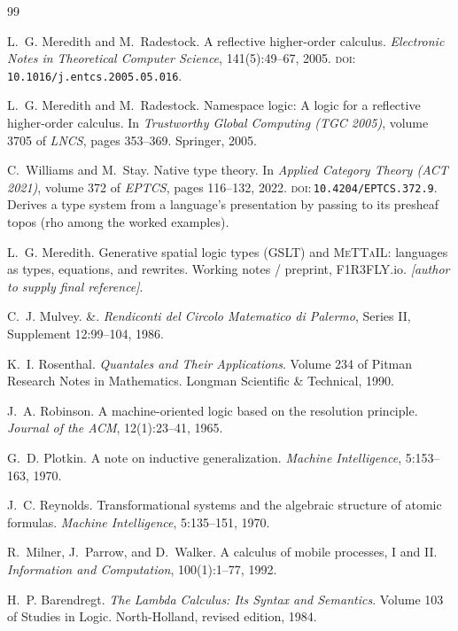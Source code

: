 \documentclass[11pt]{article}
\theoremstyle{plain}
\theoremstyle{definition}
\theoremstyle{remark}
\newcommand{\doi}[1]{\textsc{doi:}\,\texttt{#1}}
\begin{document}
\begin{thebibliography}{99}

L.~G. Meredith and M.~Radestock.
\newblock A reflective higher-order calculus.
\newblock \emph{Electronic Notes in Theoretical Computer Science}, 141(5):49--67, 2005.
\newblock \doi{10.1016/j.entcs.2005.05.016}.

L.~G. Meredith and M.~Radestock.
\newblock Namespace logic: A logic for a reflective higher-order calculus.
\newblock In \emph{Trustworthy Global Computing (TGC 2005)}, volume 3705 of \emph{LNCS}, pages 353--369. Springer, 2005.

C.~Williams and M.~Stay.
\newblock Native type theory.
\newblock In \emph{Applied Category Theory (ACT 2021)}, volume 372 of \emph{EPTCS}, pages 116--132, 2022.
\newblock \doi{10.4204/EPTCS.372.9}.
\newblock Derives a type system from a language's presentation by passing to its presheaf topos (rho among the worked examples).

L.~G. Meredith.
\newblock Generative spatial logic types (GSLT) and \textsc{MeTTaIL}: languages as types, equations, and rewrites.
\newblock Working notes / preprint, F1R3FLY.io.
\newblock \emph{[author to supply final reference]}.

C.~J. Mulvey.
\newblock \&.
\newblock \emph{Rendiconti del Circolo Matematico di Palermo}, Series II, Supplement 12:99--104, 1986.

K.~I. Rosenthal.
\newblock \emph{Quantales and Their Applications}.
\newblock Volume 234 of Pitman Research Notes in Mathematics. Longman Scientific \& Technical, 1990.

J.~A. Robinson.
\newblock A machine-oriented logic based on the resolution principle.
\newblock \emph{Journal of the ACM}, 12(1):23--41, 1965.

G.~D. Plotkin.
\newblock A note on inductive generalization.
\newblock \emph{Machine Intelligence}, 5:153--163, 1970.

J.~C. Reynolds.
\newblock Transformational systems and the algebraic structure of atomic formulas.
\newblock \emph{Machine Intelligence}, 5:135--151, 1970.

R.~Milner, J.~Parrow, and D.~Walker.
\newblock A calculus of mobile processes, I and II.
\newblock \emph{Information and Computation}, 100(1):1--77, 1992.

H.~P. Barendregt.
\newblock \emph{The Lambda Calculus: Its Syntax and Semantics}.
\newblock Volume 103 of Studies in Logic. North-Holland, revised edition, 1984.


\end{thebibliography}
\end{document}
